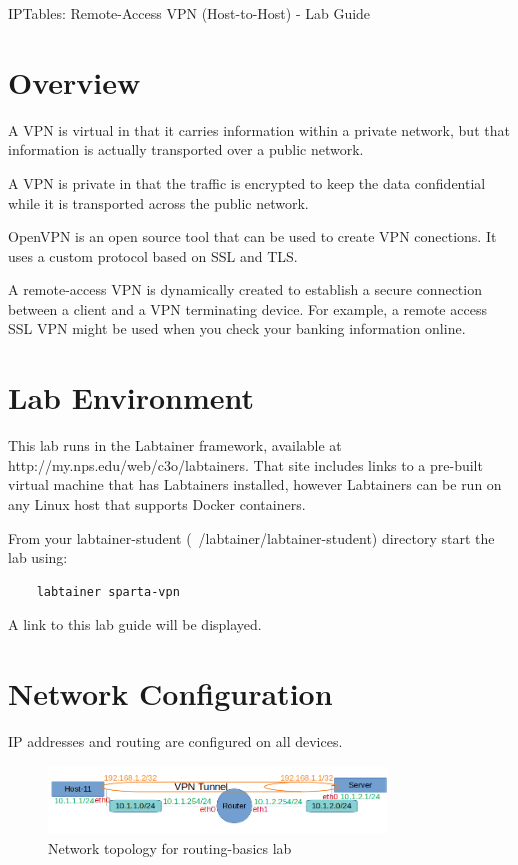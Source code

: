 


\begin{center}
{\LARGE IPTables: Remote-Access VPN (Host-to-Host) - Lab Guide}
\vspace{0.1in}\\
\end{center}

\copyrightnotice

\section{Overview}
A VPN is virtual in that it carries information within a private network, but that information is actually transported over a public network.

A VPN is private in that the traffic is encrypted to keep the data confidential while it is transported across the public network.

OpenVPN is an open source tool that can be used to create VPN conections. It uses a custom protocol based on SSL and TLS.

A remote-access VPN is dynamically created to establish a secure connection between a client and a VPN terminating device. For example, a remote access SSL VPN might be used when you check your banking information online.

\section{Lab Environment}
This lab runs in the Labtainer framework,
available at http://my.nps.edu/web/c3o/labtainers.
That site includes links to a pre-built virtual machine
that has Labtainers installed, however Labtainers can
be run on any Linux host that supports Docker containers.

From your labtainer-student (~/labtainer/labtainer-student) directory start the lab using:
\begin{verbatim}
    labtainer sparta-vpn
\end{verbatim}
\noindent A link to this lab guide will be displayed.

\section{Network Configuration}
IP addresses and routing are configured on all devices.

\begin{figure}[H]
\begin{center}
\includegraphics [width=0.8\textwidth]{labtainers-vpn1-lab-01.png}
\end{center}
\caption{Network topology for routing-basics lab}
\label{fig:topology}
\end{figure}

